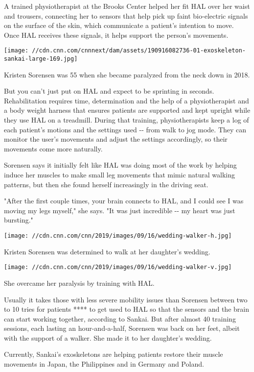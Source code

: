 A trained physiotherapist at the Brooks Center helped her fit HAL over
her waist and trousers, connecting her to sensors that help pick up
faint bio-electric signals on the surface of the skin, which communicate
a patient's intention to move. Once HAL receives these signals, it helps
support the person's movements.

\texttt{[image: //cdn.cnn.com/cnnnext/dam/assets/190916082736-01-exoskeleton-sankai-large-169.jpg]}

Kristen Sorensen was 55 when she became paralyzed from the neck down in
2018.

But you can't just put on HAL and expect to be sprinting in seconds.
Rehabilitation requires time, determination and the help of a
physiotherapist and a body weight harness that ensures patients are
supported and kept upright while they use HAL on a treadmill. During
that training, physiotherapists keep a log of each patient's motions and
the settings used -\/- from walk to jog mode. They can monitor the
user's movements and adjust the settings accordingly, so their movements
come more naturally.

Sorensen says it initially felt like HAL was doing most of the work by
helping induce her muscles to make small leg movements that mimic
natural walking patterns, but then she found herself increasingly in the
driving seat.

"After the first couple times, your brain connects to HAL, and I could
see I was moving my legs myself," she says. "It was just incredible -\/-
my heart was just bursting."

\texttt{[image: //cdn.cnn.com/cnn/2019/images/09/16/wedding-walker-h.jpg]}

Kristen Sorensen was determined to walk at her daughter's wedding.

\texttt{[image: //cdn.cnn.com/cnn/2019/images/09/16/wedding-walker-v.jpg]}

She overcame her paralysis by training with HAL.

Usually it takes those with less severe mobility issues than Sorensen
between two to 10 tries for patients **** to get used to HAL so that the
sensors and the brain can start working together, according to Sankai.
But after almost 40 training sessions, each lasting an hour-and-a-half,
Sorensen was back on her feet, albeit with the support of a walker. She
made it to her daughter's wedding.

Currently, Sankai's exoskeletons are helping patients restore their
muscle movements in Japan, the Philippines and in Germany and Poland.

